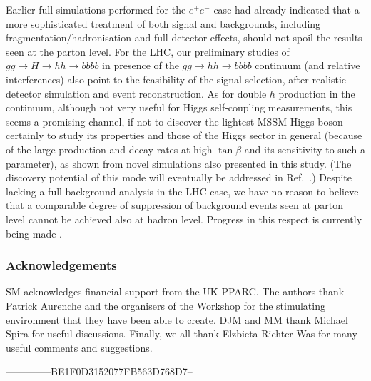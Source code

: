 Earlier full simulations performed for the $e^+e^-$ case had already
indicated that a more sophisticated treatment of both signal and
backgrounds, including fragmentation/hadronisation and full detector
effects, should not spoil the results seen at the parton level.  For the
LHC, our preliminary studies of $gg\to H\to hh\to b\bar b b\bar b$
in presence of
the $gg\to hh\to b\bar b b\bar b$ continuum (and relative interferences)
also point to the feasibility of the signal selection, after realistic
detector simulation and event reconstruction. 
As for double $h$ production in the continuum, 
although not very useful for Higgs self-coupling measurements,
this seems a promising channel, if not to discover the
lightest MSSM Higgs boson certainly to study its properties 
and those of the Higgs sector in general
 (because of the large production
and decay rates at high $\tan\beta$ and its sensitivity to such a parameter),
as shown from novel simulations also presented in this study. 
(The discovery potential of this mode will eventually be addressed
in Ref.~\cite{more}.)
Despite lacking a full
background analysis in the LHC case, we have no reason to believe that
a comparable degree of suppression of background events seen at parton level
cannot be achieved also at hadron level.  Progress in this respect is
currently being made \cite{more}.


\subsubsection*{Acknowledgements}

SM acknowledges financial support from the UK-PPARC.  The authors
thank Patrick Aurenche and the organisers of the Workshop for the
stimulating environment that they have been able to create. DJM and MM
thank Michael Spira for useful discussions. Finally, we all thank Elzbieta
Richter-Was for many useful comments and suggestions.



 

















--------------BE1F0D3152077FB563D768D7--


